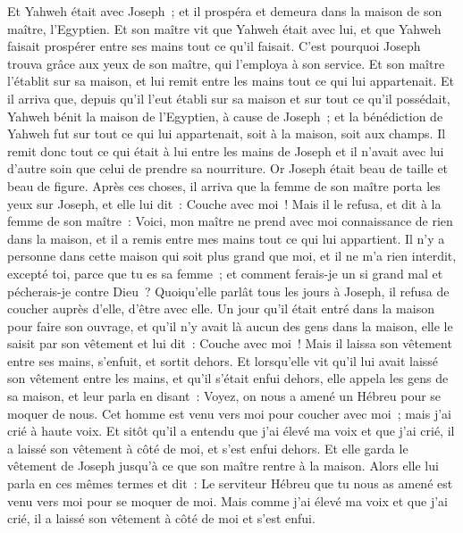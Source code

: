 \begin{multicols}{2}
Et Yahweh était avec Joseph~; et il prospéra et demeura dans la maison de son maître, l'Egyptien.
Et son maître vit que Yahweh était avec lui, et que Yahweh faisait prospérer entre ses mains tout ce qu'il faisait.
C'est pourquoi Joseph trouva grâce aux yeux de son maître, qui l'employa à son service. Et son maître l'établit sur sa maison, et lui remit entre les mains tout ce qui lui appartenait.
Et il arriva que, depuis qu'il l'eut établi sur sa maison et sur tout ce qu'il possédait, Yahweh bénit la maison de l'Egyptien, à cause de Joseph~; et la bénédiction de Yahweh fut sur tout ce qui lui appartenait, soit à la maison, soit aux champs.
Il remit donc tout ce qui était à lui entre les mains de Joseph et il n'avait avec lui d'autre soin que celui de prendre sa nourriture. Or Joseph était beau de taille et beau de figure.
Après ces choses, il arriva que la femme de son maître porta les yeux sur Joseph, et elle lui dit~: Couche avec moi~!
Mais il le refusa, et dit à la femme de son maître~: Voici, mon maître ne prend avec moi connaissance de rien dans la maison, et il a remis entre mes mains tout ce qui lui appartient.
Il n'y a personne dans cette maison qui soit plus grand que moi, et il ne m'a rien interdit, excepté toi, parce que tu es sa femme~; et comment ferais-je un si grand mal et pécherais-je contre Dieu~?
Quoiqu'elle parlât tous les jours à Joseph, il refusa de coucher auprès d'elle, d'être avec elle.
Un jour qu'il était entré dans la maison pour faire son ouvrage, et qu'il n'y avait là aucun des gens dans la maison,
elle le saisit par son vêtement et lui dit~: Couche avec moi~! Mais il laissa son vêtement entre ses mains, s'enfuit, et sortit dehors.
Et lorsqu'elle vit qu'il lui avait laissé son vêtement entre les mains, et qu'il s'était enfui dehors,
elle appela les gens de sa maison, et leur parla en disant~: Voyez, on nous a amené un Hébreu pour se moquer de nous. Cet homme est venu vers moi pour coucher avec moi~; mais j'ai crié à haute voix.
Et sitôt qu'il a entendu que j'ai élevé ma voix et que j'ai crié, il a laissé son vêtement à côté de moi, et s'est enfui dehors.
Et elle garda le vêtement de Joseph jusqu'à ce que son maître rentre à la maison.
Alors elle lui parla en ces mêmes termes et dit~: Le serviteur Hébreu que tu nous as amené est venu vers moi pour se moquer de moi.
Mais comme j'ai élevé ma voix et que j'ai crié, il a laissé son vêtement à côté de moi et s'est enfui.

\end{multicols}
